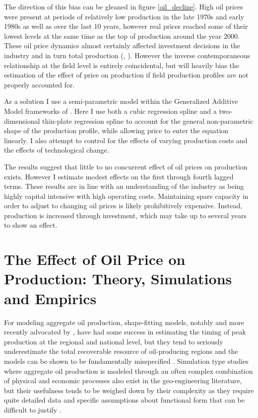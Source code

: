 \documentclass[12pt]{article}
\begin{document}
The direction of this bias can be gleaned in figure \ref{oil_decline}.  High oil prices were present at periods of relatively low production in the late 1970s and early 1980s as well as over the last 10 years, however real prices reached some of their lowest levels at the same time as the top of production around the year 2000. These oil price dynamics almost certainly affected investment decisions in the industry and in turn total production (\citep{osmundsen_is_2007}, \citep{aune_financial_2010}). However the inverse contemporaneous relationship at the field level is entirely coincidental, but will heavily bias the estimation of the effect of price on production if field production profiles are not properly accounted for. 

As a solution I use a semi-parametric model within the Generalized Additive Model frameworks of \cite{hastie_generalized_1990}.  Here I use both a cubic regression spline and a two-dimensional thin-plate regression spline to account for the general non-parametric shape of the production profile, while allowing price to enter the equation linearly. I also attempt to control for the effects of varying production costs and the effects of technological change.

The results suggest that little to no concurrent effect of oil prices on production exists.  However I estimate modest effects on the first through fourth lagged terms. These results are in line with an understanding of the industry as being highly capital intensive with high operating costs.  Maintaining spare capacity in order to adjust to changing oil prices is likely prohibitively expensive.  Instead, production is increased through investment, which may take up to several years to show an effect.

\section{The Effect of Oil Price on Production: Theory, Simulations and Empirics}

For modeling aggregate oil production, shape-fitting models, notably \citet{hubbert_energy_1962} and more recently advocated by \citet{deffeyes_hubberts_2001}, have had some success in estimating the timing of peak production at the regional and national level, but they tend to seriously underestimate the total recoverable resource of oil-producing regions and the models can be shown to be fundamentally misspecified \citep{boyce_prediction_2013}.   Simulation type studies where aggregate oil production is modeled through an often complex combination of physical and economic processes also exist in the geo-engineering literature, but their usefulness tends to be weighed down by their complexity as they require quite detailed data and specific assumptions about functional form that can be difficult to justify \citep{brandt_review_2010}.
\end{document}
